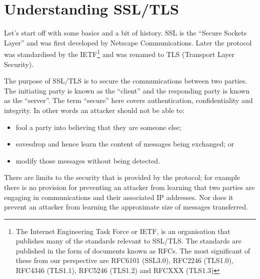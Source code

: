 \chapter{Understanding SSL/TLS}
Let's start off with some basics and a bit of history. SSL is the ``Secure 
Sockets Layer'' and was first developed by Netscape Communications. Later the 
protocol was standardised by the IETF\footnote{The Internet Engineering Task 
Force or IETF, is an organisation that publishes many of the standards relevant 
to SSL/TLS. The standards are published in the form of documents known as RFCs. 
The most significant of these from our perspective are RFC6101 (SSL3.0), 
RFC2246 (TLS1.0), RFC4346 (TLS1.1), RFC5246 (TLS1.2) and RFCXXX (TLS1.3)} and
was renamed to TLS (Transport Layer Security).

The purpose of SSL/TLS is to secure the communications between two parties. The
initiating  party is known as the ``client'' and the responding party is known
as the ``server''. The term ``secure'' here covers authentication,
confidentiality and integrity. In other words an attacker should not be able 
to:
\begin{itemize}
\item fool a party into believing that they are someone else;
\item eavesdrop and hence learn the content of messages being exchanged; or
\item modify those messages without being detected.
\end{itemize}

There are limits to the security that is provided by the protocol; for example
there is no  provision for preventing an attacker from learning that two parties
are engaging in communications and their associated IP addresses. Nor does it
prevent an attacker from learning the approximate size of messages transferred.

